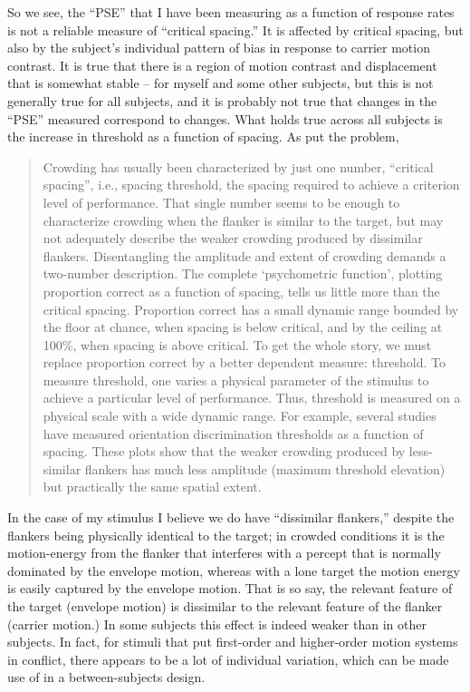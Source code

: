 \documentclass[english,noae]{article}
\begin{document}
So we see, the ``PSE'' that I have been measuring as a function
of response rates is not a reliable measure of ``critical spacing.''
It is affected by critical spacing, but also by the subject's individual
pattern of bias in response to carrier motion contrast. It is true
that there is a region of motion contrast and displacement that is
somewhat stable -- for myself and some other subjects, but this is
not generally true for all subjects, and it is probably not true that
changes in the ``PSE'' measured correspond to changes. What holds
true across all subjects is the increase in threshold as a function
of spacing. As \citep{Pelli:2008ao} put the problem,
\begin{quote}
Crowding has usually been characterized by just one number, \textquotedblleft{}critical
spacing\textquotedblright{}, i.e., spacing threshold, the spacing
required to achieve a criterion level of performance. That single
number seems to be enough to characterize crowding when the flanker
is similar to the target, but may not adequately describe the weaker
crowding produced by dissimilar flankers. Disentangling the amplitude
and extent of crowding demands a two-number description. The complete
\textquoteleft{}psychometric function\textquoteright{}, plotting proportion
correct as a function of spacing, tells us little more than the critical
spacing. Proportion correct has a small dynamic range bounded by the
floor at chance, when spacing is below critical, and by the ceiling
at 100\%, when spacing is above critical. To get the whole story,
we must replace proportion correct by a better dependent measure:
threshold. To measure threshold, one varies a physical parameter of
the stimulus to achieve a particular level of performance. Thus, threshold
is measured on a physical scale with a wide dynamic range. For example,
several studies have measured orientation discrimination thresholds
as a function of spacing. These plots show that the weaker crowding
produced by less-similar flankers has much less amplitude (maximum
threshold elevation) but practically the same spatial extent. \citep{Pelli:2008ao}
\end{quote}
In the case of my stimulus I believe we do have ``dissimilar flankers,''
despite the flankers being physically identical to the target; in
crowded conditions it is the motion-energy from the flanker that interferes
with a percept that is normally dominated by the envelope motion,
whereas with a lone target the motion energy is easily captured by
the envelope motion. That is so say, the relevant feature of the target
(envelope motion) is dissimilar to the relevant feature of the flanker
(carrier motion.) In some subjects this effect is indeed weaker than
in other subjects. In fact, for stimuli that put first-order and higher-order
motion systems in conflict, there appears to be a lot of individual
variation, which can be made use of in a between-subjects design\citep{Wilmer:2007lr,Fraser:1979ly}.
\end{document}
